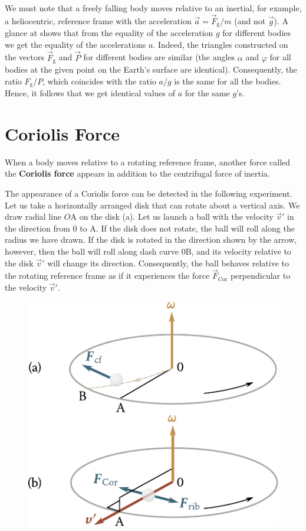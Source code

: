 We must note that a freely falling body moves relative to an inertial, for example, a heliocentric, reference frame with the acceleration $\vec{a}=\vec{F}_{\text{g}}/m$ (and not $\vec{g}$). A glance at  shows that from the equality of the acceleration $g$ for different bodies we get the equality of the accelerations $a$. Indeed, the triangles constructed on the vectors $\vec{F}_{\text{g}}$ and $\vec{P}$ for different bodies are similar (the angles $\alpha$ and $\varphi$ for all bodies at the given point on the Earth's surface are identical). Consequently, the ratio $F_{\text{g}}/P$, which coincides with the ratio $a/g$ is the same for all the bodies. Hence, it follows that we get identical values of $a$ for the same $g$'s.

\section{Coriolis Force}\label{sec:4_3}

When a body moves relative to a rotating reference frame, another force called the \textbf{Coriolis force} appears in addition to the centrifugal force of inertia.

The appearance of a Coriolis force can be detected in the following experiment. Let us take a horizontally arranged disk that can rotate about a vertical axis. We draw radial line $O$A on the disk (a). Let us launch a ball with the velocity $\vec{v}'$ in the direction from $0$ to A. If the disk does not rotate, the ball will roll along the radius we have drawn. If the disk is rotated in the direction shown by the arrow, however, then the ball will roll along dash curve $0$B, and its velocity relative to the disk $\vec{v}'$ will change its direction. Consequently, the ball behaves relative to the rotating reference frame as if it experiences the force $\vec{F}_{\text{Cor}}$ perpendicular to the velocity $\vec{v}'$.

\begin{figure}[t]
	\begin{center}
		\includegraphics[scale=1]{figures/ch_04/fig_4_6.pdf}
		\caption[]{}
		\label{fig:4_6}
	\end{center}
	\vspace{-0.8cm}
\end{figure}

